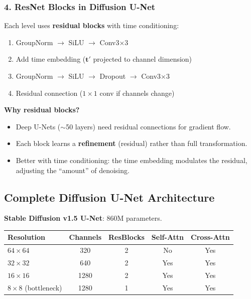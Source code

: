 \subsubsection{4. ResNet Blocks in Diffusion U-Net}
Each level uses \textbf{residual blocks} with time conditioning:
\begin{enumerate}
\item GroupNorm $\to$ SiLU $\to$ Conv3$\times$3
\item Add time embedding ($\mathbf{t}'$ projected to channel dimension)
\item GroupNorm $\to$ SiLU $\to$ Dropout $\to$ Conv3$\times$3
\item Residual connection ($1{\times}1$ conv if channels change)
\end{enumerate}

\textbf{Why residual blocks?}
\begin{itemize}
\item Deep U-Nets ($\sim$50 layers) need residual connections for gradient flow.
\item Each block learns a \textbf{refinement} (residual) rather than full transformation.
\item Better with time conditioning: the time embedding modulates the residual, adjusting the ``amount'' of denoising.
\end{itemize}

\subsection{Complete Diffusion U-Net Architecture}

\textbf{Stable Diffusion v1.5 U-Net}: 860M parameters.

\begin{center}\small
\begin{tabular}{lcccc}\toprule
\textbf{Resolution} & \textbf{Channels} & \textbf{ResBlocks} & \textbf{Self-Attn} & \textbf{Cross-Attn} \\\midrule
$64 \times 64$ & 320 & 2 & No & Yes \\
$32 \times 32$ & 640 & 2 & Yes & Yes \\
$16 \times 16$ & 1280 & 2 & Yes & Yes \\
$8 \times 8$ (bottleneck) & 1280 & 1 & Yes & Yes \\
\bottomrule
\end{tabular}
\end{center}

